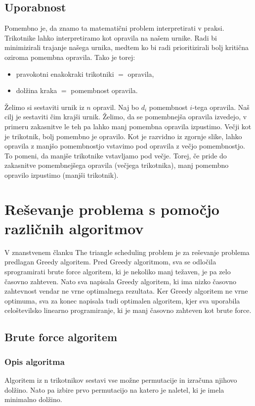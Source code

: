 \documentclass[a4paper,12pt]{article}
\theoremstyle{definition}
\theoremstyle{plain}
\begin{document}
\subsection{Uporabnost}
Pomembno je, da znamo ta matematični problem interpretirati v praksi. Trikotnike lahko interpretiramo kot opravila na našem urnike. Radi bi minimizirali trajanje našega urnika, medtem ko bi radi prioritizirali bolj kritična oziroma pomembna opravila.
Tako je torej:
\begin{itemize}
    \item pravokotni enakokraki trikotniki $=$ opravila,
    \item dolžina kraka $=$ pomembnost opravila.
\end{itemize}

Želimo si sestaviti urnik iz $n$ opravil. Naj bo $d_i$ pomembnost $i$-tega opravila. Naš cilj je sestaviti čim krajši urnik. Želimo, da se pomembnejša opravila izvedejo, v primeru zakasnitve le teh pa lahko manj pomembna opravila izpustimo.
Večji kot je trikotnik, bolj pomembno je opravilo. Kot je razvidno iz zgornje slike, lahko opravila z manjšo pomembnostjo vstavimo pod opravila z večjo pomembnostjo. To pomeni, da manjše trikotnike vstavljamo pod večje. Torej, če pride do zakasnitve
pomembnejšega opravila (večjega trikotnika), manj pomembno opravilo  izpustimo (manjši trikotnik).


\section{Reševanje problema s pomočjo različnih algoritmov}
V znanstvenem članku The triangle scheduling problem \cite{triangle} je za reševanje problema predlagan Greedy algoritem. Pred Greedy algoritmom, sva se odločila sprogramirati brute force algoritem, ki je nekoliko manj težaven, je pa zelo časovno zahteven. 
Nato sva napisala Greedy algoritem, ki ima nizko časovno zahtevnost vendar ne vrne optimalnega rezultata. Ker Greedy algoritem ne vrne optimuma, sva za konec napisala tudi optimalen algoritem, kjer sva uporabila celoštevilsko linearno programiranje, ki je manj časovno zahteven kot brute force.


\subsection{Brute force algoritem}
\subsubsection{Opis algoritma}
Algoritem iz n trikotnikov sestavi vse možne permutacije in izračuna njihovo dolžino. Nato 
pa izbire prvo permutacijo na katero je naletel, ki je imela minimalno dolžino.
\end{document}

